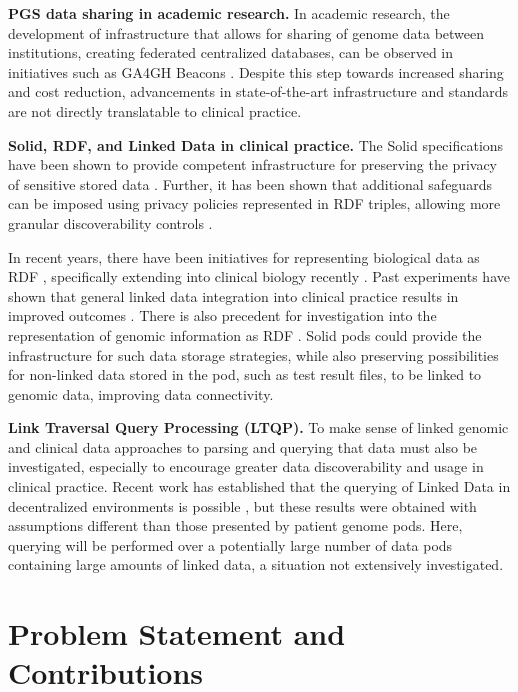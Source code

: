 \documentclass[runningheads]{llncs}
\begin{document}
\textbf{PGS data sharing in academic research.}
In academic research, the development of infrastructure that allows for sharing of genome data between institutions, creating federated centralized databases, can be observed in initiatives such as GA4GH Beacons \cite{rambla_beacon_2022}.
Despite this step towards increased sharing and cost reduction, advancements in state-of-the-art infrastructure and standards are not directly translatable to clinical practice. 

\textbf{Solid, RDF, and Linked Data in clinical practice.}
The Solid specifications have been shown to provide competent infrastructure for preserving the privacy of sensitive stored data \cite{esposito_assessing_2022}.
Further, it has been shown that additional safeguards can be imposed using privacy policies represented in RDF triples, allowing more granular discoverability controls \cite{benaribi_sparql-based_2023}. 

In recent years, there have been initiatives for representing biological data as RDF \cite{sib_swiss_institute_of_bioinformatics_rdf_group_members_sib_2024}, specifically extending into clinical biology recently \cite{van_der_horst_bridging_2023}. 
Past experiments have shown that general linked data integration into clinical practice results in improved outcomes \cite{farinelli_linked_2015}.
There is also precedent for investigation into the representation of genomic information as RDF \cite{prasanna_scalable_2023}\cite{van_der_horst_bridging_2023}.
Solid pods could provide the infrastructure for such data storage strategies, while also preserving possibilities for non-linked data stored in the pod, such as test result files, to be linked to genomic data, improving data connectivity. 

\textbf{Link Traversal Query Processing (LTQP).}
To make sense of linked genomic and clinical data approaches to parsing and querying that data must also be investigated, especially to encourage greater data discoverability and usage in clinical practice.
Recent work has established that the querying of Linked Data in decentralized environments is possible \cite{taelman_evaluation_2023}, but these results were obtained with assumptions different than those presented by patient genome pods.
Here, querying will be performed over a potentially large number of data pods containing large amounts of linked data, a situation not extensively investigated. 

\section{Problem Statement and Contributions}

\end{document}
